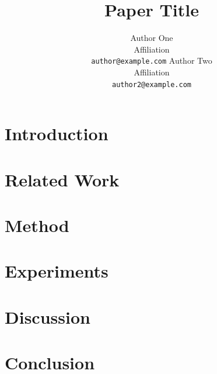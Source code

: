 \documentclass{neurips_2025}
\title{Paper Title}
\author{%
  Author One\\
  Affiliation\\
  \texttt{author@example.com}
  \And
  Author Two\\
  Affiliation\\
  \texttt{author2@example.com}
}
\begin{document}
\maketitle

\begin{abstract}
\end{abstract}

\section{Introduction}

\section{Related Work}

\section{Method}

\section{Experiments}

\section{Discussion}

\section{Conclusion}



\end{document}
